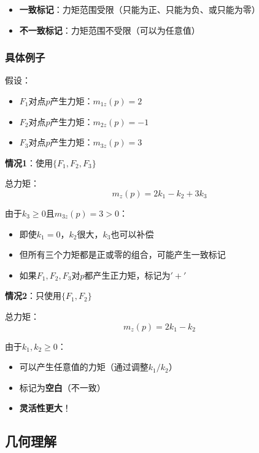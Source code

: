 \documentclass[12pt,a4paper]{article}
\begin{document}
\begin{itemize}
    \item \textbf{一致标记}：力矩范围受限（只能为正、只能为负、或只能为零）
    \item \textbf{不一致标记}：力矩范围不受限（可以为任意值）
\end{itemize}

\subsubsection{具体例子}

假设：
\begin{itemize}
    \item $F_1$对点$p$产生力矩：$m_{1z}(p) = 2$
    \item $F_2$对点$p$产生力矩：$m_{2z}(p) = -1$
    \item $F_3$对点$p$产生力矩：$m_{3z}(p) = 3$
\end{itemize}

\textbf{情况1}：使用$\{F_1, F_2, F_3\}$

总力矩：
\begin{equation}
m_z(p) = 2k_1 - k_2 + 3k_3
\end{equation}

由于$k_3 \geq 0$且$m_{3z}(p) = 3 > 0$：
\begin{itemize}
    \item 即使$k_1 = 0$，$k_2$很大，$k_3$也可以补偿
    \item 但所有三个力矩都是正或零的组合，可能产生一致标记
    \item 如果$F_1, F_2, F_3$对$p$都产生正力矩，标记为$'+'$
\end{itemize}

\textbf{情况2}：只使用$\{F_1, F_2\}$

总力矩：
\begin{equation}
m_z(p) = 2k_1 - k_2
\end{equation}

由于$k_1, k_2 \geq 0$：
\begin{itemize}
    \item 可以产生任意值的力矩（通过调整$k_1/k_2$）
    \item 标记为\textbf{空白}（不一致）
    \item \textbf{灵活性更大}！
\end{itemize}

\subsection{几何理解}
\end{document}
